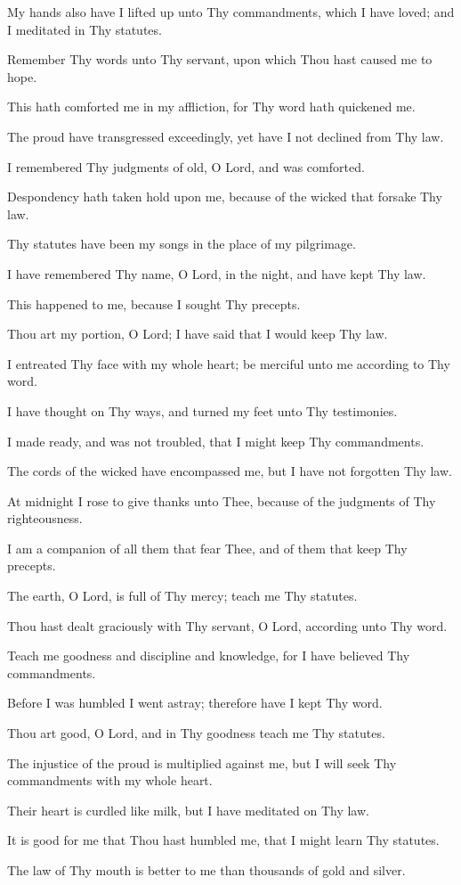 My hands also have I lifted up unto Thy commandments,
which I have loved; and I meditated in Thy statutes.

Remember Thy words unto Thy servant, upon which Thou
hast caused me to hope.

This hath comforted me in my affliction, for Thy word hath
quickened me.

The proud have transgressed exceedingly, yet have I not
declined from Thy law.

I remembered Thy judgments of old, O Lord, and was
comforted.

Despondency hath taken hold upon me, because of the wicked
that forsake Thy law.

Thy statutes have been my songs in the place of my
pilgrimage.

I have remembered Thy name, O Lord, in the night, and have
kept Thy law.

This happened to me, because I sought Thy precepts.

Thou art my portion, O Lord; I have said that I would keep Thy
law.

I entreated Thy face with my whole heart; be merciful unto me
according to Thy word.

I have thought on Thy ways, and turned my feet unto Thy
testimonies.

I made ready, and was not troubled, that I might keep Thy
commandments.

The cords of the wicked have encompassed me, but I have not
forgotten Thy law.

At midnight I rose to give thanks unto Thee, because of the
judgments of Thy righteousness.

I am a companion of all them that fear Thee, and of them that
keep Thy precepts.

The earth, O Lord, is full of Thy mercy; teach me Thy statutes.

Thou hast dealt graciously with Thy servant, O Lord, according
unto Thy word.

Teach me goodness and discipline and knowledge, for I have
believed Thy commandments.

Before I was humbled I went astray; therefore have I kept Thy
word.

Thou art good, O Lord, and in Thy goodness teach me Thy
statutes.

The injustice of the proud is multiplied against me, but I will
seek Thy commandments with my whole heart.

Their heart is curdled like milk, but I have meditated on Thy
law.

It is good for me that Thou hast humbled me, that I might
learn Thy statutes.

The law of Thy mouth is better to me than thousands of gold
and silver.
